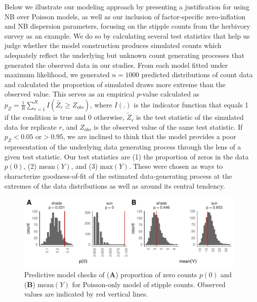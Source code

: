 \documentclass[11pt, oneside]{amsart}
\begin{document}
Below we illustrate our modeling approach by presenting a justification for using NB over Poisson models, as well as our inclusion of factor-specific zero-inflation and NB dispersion parameters, focusing on the stipple counts from the herbivory survey as an example. We do so by calculating several test statistics that help us judge whether the model construction produces simulated counts which adequately reflect the underlying but unknown count generating processes that generated the observed data in our studies. From each model fitted under maximum likelihood, we generated $n=1000$ predicted distributions of count data and calculated the proportion of simulated draws more extreme than the observed value. This serves as an empirical $p$-value calculated as $p_{Z} = \frac{1}{R}\sum^{R}_{r=1} I(\tilde{Z_{r}} \geq Z_{obs})$, where $I(.)$ is the indicator function that equals 1 if the condition is true and 0 otherwise, $\tilde{Z}_{r}$ is the test statistic of the simulated data for replicate $r$, and $Z_{obs}$ is the observed value of the same test statistic. If $p_{Z} < 0.05 \text{ or} > 0.95$, we are inclined to think that the model provides a poor representation of the underlying data generating process through the lens of a given test statistic. Our test statistics are (1) the proportion of zeros in the data $p(0)$, (2) $\text{mean}(Y)$, and (3) $\text{max}(Y)$. These were chosen as ways to characterize goodness-of-fit of the estimated data-generating process at the extremes of the data distributions as well as around its central tendency.

\begin{figure}[!t]
\begin{center}
\includegraphics[scale = 0.8]{POIS_stip0_pp}
\caption{Predictive model checks of (\textbf{A}) proportion of zero counts $p(0)$ and (\textbf{B}) $\text{mean}(Y)$ for Poisson-only model of stipple counts. Observed values are indicated by red vertical lines.}
\label{fig:three}
\end{center}
\end{figure}
\end{document}
